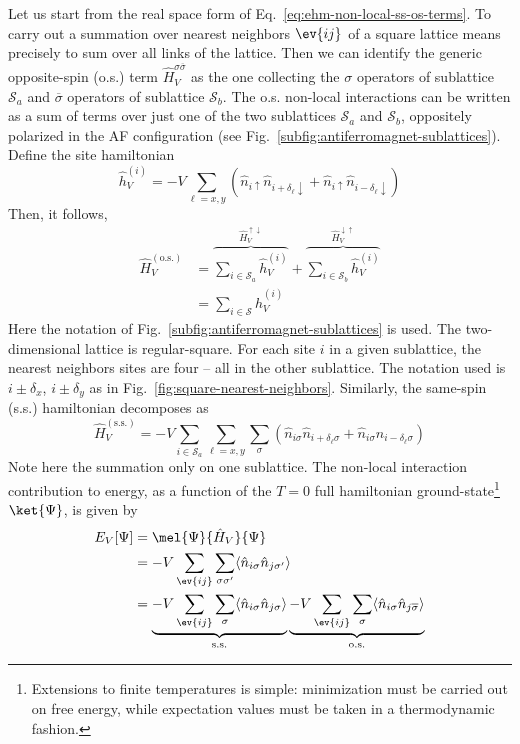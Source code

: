 Let us start from the real space form of Eq.~\eqref{eq:ehm-non-local-ss-os-terms}. To carry out a summation over nearest neighbors $\ev{ij}$ of a square lattice means precisely to sum over all links of the lattice. Then we can identify the generic opposite-spin (o.s.) term $\hat H_V^{\sigma \overline{\sigma}}$ as the one collecting the $\sigma$ operators of sublattice $\mathcal{S}_a$ and $\overline{\sigma}$ operators of sublattice $\mathcal{S}_b$. The o.s. non-local interactions can be written as a sum of terms over just one of the two sublattices $\mathcal{S}_a$ and $\mathcal{S}_b$, oppositely polarized in the AF configuration (see Fig.~\ref{subfig:antiferromagnet-sublattices}). Define the site hamiltonian
\begin{equation}\label{eq:ehm-mft-onsite-hamiltonian}
	\hat h_V^{(i)} = -V \sum_{\ell = x,y} \left(
		\hat n_{i\uparrow} \hat n_{i+\delta_\ell \downarrow} + \hat n_{i\uparrow} \hat n_{i-\delta_\ell \downarrow} 
	\right)
\end{equation}
Then, it follows,
\begin{align}
	\hat H_V^{(\mathrm{o.s.})} &= \overbrace{
		\sum_{i \in \mathcal{S}_a} \hat h_V^{(i)}
	}^{\hat H_V^{\uparrow\downarrow}} + \overbrace{
		\sum_{i \in \mathcal{S}_b} \hat h_V^{(i)}
	}^{\hat H_V^{\downarrow\uparrow}} \nonumber \\
	&= \sum_{i \in \mathcal{S}} \hat h_V^{(i)} \label{eq:ehm-mft-nonlocal-opposite-spin}
\end{align}
Here the notation of Fig.~\ref{subfig:antiferromagnet-sublattices} is used. The two-dimensional lattice is regular-square. For each site $i$ in a given sublattice, the nearest neighbors sites are four -- all in the other sublattice. The notation used is $i \pm \delta_x$, $i \pm  \delta_y$ as in Fig.~\ref{fig:square-nearest-neighbors}. Similarly, the same-spin (s.s.) hamiltonian decomposes as
\[
	\hat H_V^{(\mathrm{s.s.})} = -V \sum_{i \in \mathcal{S}_a} \sum_{\ell = x,y} \sum_\sigma \left(
		\hat n_{i\sigma} \hat n_{i + \delta_\ell \sigma} + \hat n_{i\sigma} \hat n_{i - \delta_\ell \sigma} 
	\right) 
\]
Note here the summation only on one sublattice. The non-local interaction contribution to energy, as a function of the $T=0$ full hamiltonian ground-state\footnote{
	Extensions to finite temperatures is simple: minimization must be carried out on free energy, while expectation values must be taken in a thermodynamic fashion.
} $\ket{\Psi}$, is given by
\begin{align}
	E_V [\Psi] &= \mel{\Psi}{\hat H_V}{\Psi} \nonumber \\
	&= -V \sum_{\ev{ij}} \sum_{\sigma\sigma'} \langle
	\hat n_{i\sigma} \hat n_{j\sigma'}
	\rangle \nonumber \\
	&= \underbrace{
		-V \sum_{\ev{ij}} \sum_{\sigma} \langle
		\hat n_{i\sigma} \hat n_{j\sigma}
		\rangle
	}_{\mathrm{s.s.}} \underbrace{
		-V \sum_{\ev{ij}} \sum_{\sigma} \langle
		\hat n_{i\sigma} \hat n_{j\overline{\sigma}}
		\rangle
	}_{\mathrm{o.s.}} \label{eq:ehm-non-local-ss-os-terms-2}
\end{align}
